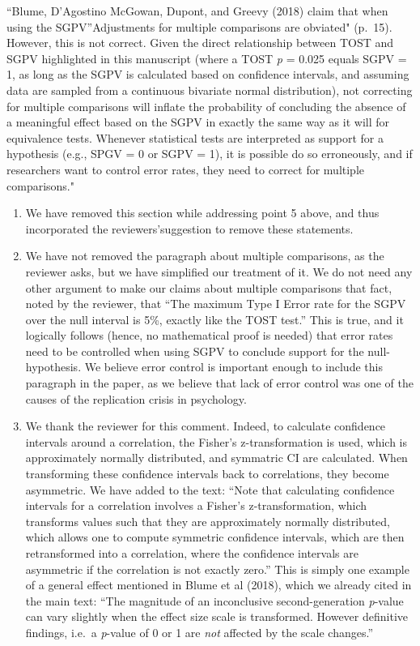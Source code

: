 \documentclass[man]{apa6}
\begin{document}
\enquote{Blume, D'Agostino McGowan, Dupont, and Greevy (2018) claim that
when using the SGPV}Adjustments for multiple comparisons are obviated"
(p.~15). However, this is not correct. Given the direct relationship
between TOST and SGPV highlighted in this manuscript (where a TOST
\emph{p} = 0.025 equals SGPV = 1, as long as the SGPV is calculated
based on confidence intervals, and assuming data are sampled from a
continuous bivariate normal distribution), not correcting for multiple
comparisons will inflate the probability of concluding the absence of a
meaningful effect based on the SGPV in exactly the same way as it will
for equivalence tests. Whenever statistical tests are interpreted as
support for a hypothesis (e.g., SPGV = 0 or SGPV = 1), it is possible do
so erroneously, and if researchers want to control error rates, they
need to correct for multiple comparisons."

\begin{enumerate}
\def\labelenumi{\arabic{enumi}.}
\setcounter{enumi}{5}
\item
  We have removed this section while addressing point 5 above, and thus
  incorporated the reviewers'suggestion to remove these statements.
\item
  We have not removed the paragraph about multiple comparisons, as the
  reviewer asks, but we have simplified our treatment of it. We do not
  need any other argument to make our claims about multiple comparisons
  that fact, noted by the reviewer, that \enquote{The maximum Type I
  Error rate for the SGPV over the null interval is 5\%, exactly like
  the TOST test.} This is true, and it logically follows (hence, no
  mathematical proof is needed) that error rates need to be controlled
  when using SGPV to conclude support for the null-hypothesis. We
  believe error control is important enough to include this paragraph in
  the paper, as we believe that lack of error control was one of the
  causes of the replication crisis in psychology.
\item
  We thank the reviewer for this comment. Indeed, to calculate
  confidence intervals around a correlation, the Fisher's
  z-transformation is used, which is approximately normally distributed,
  and symmatric CI are calculated. When transforming these confidence
  intervals back to correlations, they become asymmetric. We have added
  to the text: \enquote{Note that calculating confidence intervals for a
  correlation involves a Fisher's z-transformation, which transforms
  values such that they are approximately normally distributed, which
  allows one to compute symmetric confidence intervals, which are then
  retransformed into a correlation, where the confidence intervals are
  asymmetric if the correlation is not exactly zero.} This is simply one
  example of a general effect mentioned in Blume et al (2018), which we
  already cited in the main text: \enquote{The magnitude of an
  inconclusive second-generation \emph{p}-value can vary slightly when
  the effect size scale is transformed. However definitive findings,
  i.e.~a \emph{p}-value of 0 or 1 are \emph{not} affected by the scale
  changes.}
\end{enumerate}
\end{document}
